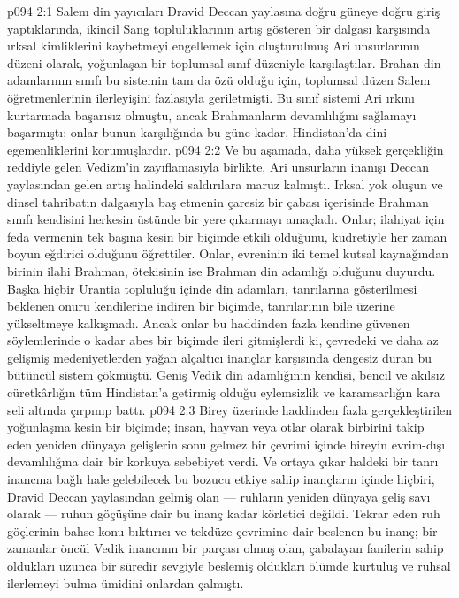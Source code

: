 \vs p094 2:1 Salem din yayıcıları Dravid Deccan yaylasına doğru güneye doğru giriş yaptıklarında, ikincil Sang topluluklarının artış gösteren bir dalgası karşısında ırksal kimliklerini kaybetmeyi engellemek için oluşturulmuş Ari unsurlarının düzeni olarak, yoğunlaşan bir toplumsal sınıf düzeniyle karşılaştılar. Brahan din adamlarının sınıfı bu sistemin tam da özü olduğu için, toplumsal düzen Salem öğretmenlerinin ilerleyişini fazlasıyla geriletmişti. Bu sınıf sistemi Ari ırkını kurtarmada başarısız olmuştu, ancak Brahmanların devamlılığını sağlamayı başarmıştı; onlar bunun karşılığında bu güne kadar, Hindistan’da dini egemenliklerini korumuşlardır.
\vs p094 2:2 Ve bu aşamada, daha yüksek gerçekliğin reddiyle gelen Vedizm’in zayıflamasıyla birlikte, Ari unsurların inanışı Deccan yaylasından gelen artış halindeki saldırılara maruz kalmıştı. Irksal yok oluşun ve dinsel tahribatın dalgasıyla baş etmenin çaresiz bir çabası içerisinde Brahman sınıfı kendisini herkesin üstünde bir yere çıkarmayı amaçladı. Onlar; ilahiyat için feda vermenin tek başına kesin bir biçimde etkili olduğunu, kudretiyle her zaman boyun eğdirici olduğunu öğrettiler. Onlar, evreninin iki temel kutsal kaynağından birinin ilahi Brahman, ötekisinin ise Brahman din adamlığı olduğunu duyurdu. Başka hiçbir Urantia topluluğu içinde din adamları, tanrılarına gösterilmesi beklenen onuru kendilerine indiren bir biçimde, tanrılarının bile üzerine yükseltmeye kalkışmadı. Ancak onlar bu haddinden fazla kendine güvenen söylemlerinde o kadar abes bir biçimde ileri gitmişlerdi ki, çevredeki ve daha az gelişmiş medeniyetlerden yağan alçaltıcı inançlar karşısında dengesiz duran bu bütüncül sistem çökmüştü. Geniş Vedik din adamlığının kendisi, bencil ve akılsız cüretkârlığın tüm Hindistan’a getirmiş olduğu eylemsizlik ve karamsarlığın kara seli altında çırpınıp battı.
\vs p094 2:3 Birey üzerinde haddinden fazla gerçekleştirilen yoğunlaşma kesin bir biçimde; insan, hayvan veya otlar olarak birbirini takip eden yeniden dünyaya gelişlerin sonu gelmez bir çevrimi içinde bireyin evrim\hyp{}dışı devamlılığına dair bir korkuya sebebiyet verdi. Ve ortaya çıkar haldeki bir tanrı inancına bağlı hale gelebilecek bu bozucu etkiye sahip inançların içinde hiçbiri, Dravid Deccan yaylasından gelmiş olan --- ruhların yeniden dünyaya geliş savı olarak --- ruhun göçüşüne dair bu inanç kadar körletici değildi. Tekrar eden ruh göçlerinin bahse konu bıktırıcı ve tekdüze çevrimine dair beslenen bu inanç; bir zamanlar öncül Vedik inancının bir parçası olmuş olan, çabalayan fanilerin sahip oldukları uzunca bir süredir sevgiyle beslemiş oldukları ölümde kurtuluş ve ruhsal ilerlemeyi bulma ümidini onlardan çalmıştı.
